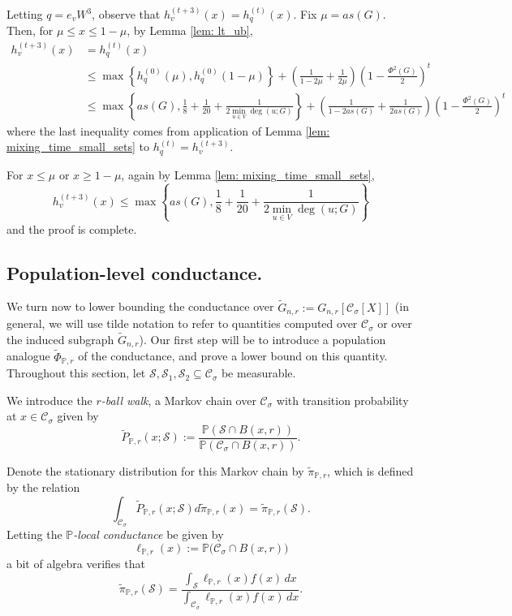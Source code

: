 \documentclass{article}
\newcommand{\set}[1]{\left\{#1\right\}}
\newcommand{\1}{\mathbf{1}}
\newcommand{\Xbf}{X}             %
\newcommand{\Pbb}{\mathbb{P}}
\newcommand{\Sset}{\mathcal{S}}
\newcommand{\Cset}{\mathcal{C}}
\newcommand{\Csig}{\Cset_{\sigma}}
\newcommand{\dx}{\,dx}
\newcommand{\piwt}{\widetilde{\pi}}
\theoremstyle{aldenthm}
\theoremstyle{aldenrmrk}
\begin{document}
Letting $q = e_v W^3$, observe that $h_v^{(t + 3)}(x) = h_q^{(t)}(x)$. Fix $\mu = as(G)$. Then, for $\mu \leq x \leq 1 - \mu$, by Lemma \ref{lem: lt_ub},
\begin{align*}
h_v^{(t + 3)}(x) & = h_q^{(t)}(x) \\
& \leq \max \set{h_q^{(0)}(\mu), h_q^{(0)}(1 - \mu) }  + \left(\frac{1}{1 - 2 \mu} + \frac{1}{2\mu}\right) \left(1 - \frac{\Phi^2(G)}{2}\right)^t\\
& \leq \max \set{as(G), \frac{1}{8} + \frac{1}{20} + \frac{1}{2 \min_{u \in V} \deg(u;G)}} + \left(\frac{1}{1 - 2a s(G)} + \frac{1}{2 a s(G)}\right) \left(1 - \frac{\Phi^2(G)}{2}\right)^t
\end{align*}
where the last inequality comes from application of Lemma \ref{lem: mixing_time_small_sets} to $h_q^{(t)} = h_v^{(t + 3)}$. 

For $x \leq \mu$ or $x \geq 1 - \mu$, again by Lemma \ref{lem: mixing_time_small_sets},
\begin{equation*}
h_v^{(t + 3)}(x) \leq \max \set{as(G), \frac{1}{8} + \frac{1}{20} + \frac{1}{2 \min_{u \in V} \deg(u;G)}}
\end{equation*}
and the proof is complete. 

\subsection{Population-level conductance.}
\label{sec: population_conductance_function}

We turn now to lower bounding the conductance over $\widetilde{G}_{n,r} := G_{n,r}[\Csig[\Xbf]]$ (in general, we will use tilde notation to refer to quantities computed over $\Csig$ or over the induced subgraph $\widetilde{G}_{n,r}$). Our first step will be to introduce a population analogue $\widetilde{\Phi}_{\Pbb,r}$ of the conductance, and prove a lower bound on this quantity. Throughout this section, let $\Sset, \Sset_1, \Sset_2 \subseteq \Csig$ be measurable.

We introduce the \emph{$r$-ball walk}, a Markov chain over $\Csig$ with transition probability at $x \in \Csig$ given by 
\begin{equation*}
\widetilde{P}_{\Pbb,r}(x; \Sset) := \frac{\Pbb(\Sset \cap B(x,r))}{\Pbb(\Csig \cap B(x,r))}.
\end{equation*}

Denote the stationary distribution for this Markov chain by $\piwt_{\Pbb,r}$, which is defined by the relation
\begin{equation*}
\int_{\Csig} \widetilde{P}_{\Pbb,r}(x; \Sset) d\piwt_{\Pbb,r}(x) = \piwt_{\Pbb,r}(\Sset).
\end{equation*}
Letting the \emph{$\Pbb$-local conductance} be given by
\begin{equation*}
\ell_{\Pbb,r}(x) := \Pbb\bigl(\Csig \cap B(x,r)\bigr)
\end{equation*}
a bit of algebra verifies that
\begin{equation*}
\piwt_{\Pbb,r}(\Sset) = \frac{\int_{\Sset} \ell_{\Pbb,r}(x) f(x) \dx}{\int_{\Csig} \ell_{\Pbb,r}(x) f(x) \dx}.
\end{equation*}
\end{document}
